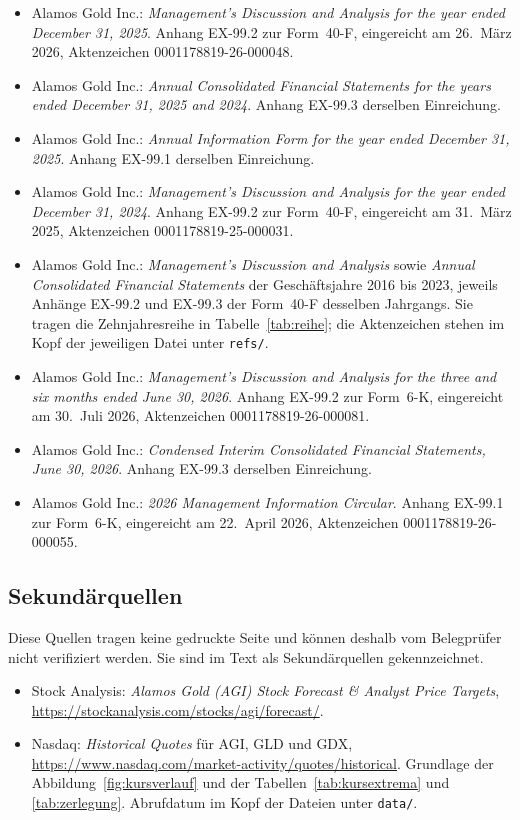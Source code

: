 \begin{itemize}
\item \label{quelle:mda2025} Alamos Gold Inc.: \emph{Management's Discussion
and Analysis for the year ended December 31, 2025}. Anhang EX-99.2 zur
Form~40-F, eingereicht am 26.~M\"arz 2026, Aktenzeichen
0001178819-26-000048.
\item \label{quelle:fs2025} Alamos Gold Inc.: \emph{Annual Consolidated
Financial Statements for the years ended December 31, 2025 and 2024}. Anhang
EX-99.3 derselben Einreichung.
\item \label{quelle:aif2025} Alamos Gold Inc.: \emph{Annual Information Form
for the year ended December 31, 2025}. Anhang EX-99.1 derselben Einreichung.
\item \label{quelle:mda2024} Alamos Gold Inc.: \emph{Management's Discussion
and Analysis for the year ended December 31, 2024}. Anhang EX-99.2 zur
Form~40-F, eingereicht am 31.~M\"arz 2025, Aktenzeichen
0001178819-25-000031.
\item \label{quelle:reihe} Alamos Gold Inc.: \emph{Management's Discussion
and Analysis} sowie \emph{Annual Consolidated Financial Statements} der
Gesch\"aftsjahre 2016 bis 2023, jeweils Anh\"ange EX-99.2 und EX-99.3 der
Form~40-F desselben Jahrgangs. Sie tragen die Zehnjahresreihe in
Tabelle~\ref{tab:reihe}; die Aktenzeichen stehen im Kopf der jeweiligen
Datei unter \texttt{refs/}.
\item \label{quelle:zb} Alamos Gold Inc.:
\emph{Management's Discussion and Analysis for the three and six months ended
June 30, 2026}. Anhang EX-99.2 zur Form~6-K, eingereicht am 30.~Juli 2026,
Aktenzeichen 0001178819-26-000081.
\item \label{quelle:zba} Alamos Gold
Inc.: \emph{Condensed Interim Consolidated Financial Statements, June 30,
2026}. Anhang EX-99.3 derselben Einreichung.
\item \label{quelle:circ} Alamos Gold Inc.: \emph{2026 Management
Information Circular}. Anhang EX-99.1 zur Form~6-K, eingereicht am
22.~April 2026, Aktenzeichen 0001178819-26-000055.
\end{itemize}

\subsection*{Sekund\"arquellen}

Diese Quellen tragen keine gedruckte Seite und k\"onnen deshalb vom
Belegpr\"ufer nicht verifiziert werden. Sie sind im Text als
Sekund\"arquellen gekennzeichnet.

\begin{itemize}
\item \label{quelle:konsens} Stock Analysis: \emph{Alamos Gold (AGI) Stock
Forecast \& Analyst Price Targets}, \url{https://stockanalysis.com/stocks/agi/forecast/}.
\item \label{quelle:nasdaq} Nasdaq: \emph{Historical Quotes} f\"ur AGI, GLD und
GDX, \url{https://www.nasdaq.com/market-activity/quotes/historical}. Grundlage
der Abbildung~\ref{fig:kursverlauf} und der Tabellen~\ref{tab:kursextrema}
und \ref{tab:zerlegung}. Abrufdatum im Kopf der Dateien unter \texttt{data/}.
\end{itemize}

